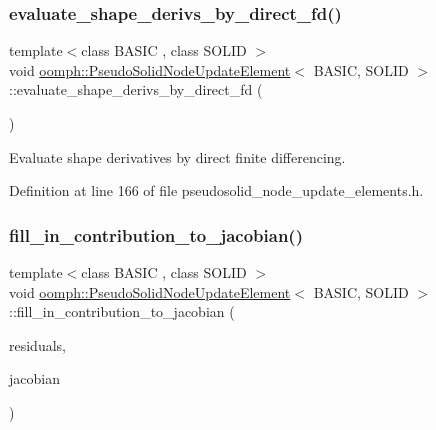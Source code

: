 \subsubsection{\texorpdfstring{evaluate\+\_\+shape\+\_\+derivs\+\_\+by\+\_\+direct\+\_\+fd()}{evaluate\_shape\_derivs\_by\_direct\_fd()}}
{\footnotesize\ttfamily template$<$class B\+A\+S\+IC , class S\+O\+L\+ID $>$ \\
void \hyperlink{classoomph_1_1PseudoSolidNodeUpdateElement}{oomph\+::\+Pseudo\+Solid\+Node\+Update\+Element}$<$ B\+A\+S\+IC, S\+O\+L\+ID $>$\+::evaluate\+\_\+shape\+\_\+derivs\+\_\+by\+\_\+direct\+\_\+fd (\begin{DoxyParamCaption}{ }\end{DoxyParamCaption})\hspace{0.3cm}{\ttfamily [inline]}}



Evaluate shape derivatives by direct finite differencing. 



Definition at line 166 of file pseudosolid\+\_\+node\+\_\+update\+\_\+elements.\+h.

\mbox{\label{classoomph_1_1PseudoSolidNodeUpdateElement_a6e3b3193e2d66317dc45f17217ddb5c3}} 
\subsubsection{\texorpdfstring{fill\+\_\+in\+\_\+contribution\+\_\+to\+\_\+jacobian()}{fill\_in\_contribution\_to\_jacobian()}}
{\footnotesize\ttfamily template$<$class B\+A\+S\+IC , class S\+O\+L\+ID $>$ \\
void \hyperlink{classoomph_1_1PseudoSolidNodeUpdateElement}{oomph\+::\+Pseudo\+Solid\+Node\+Update\+Element}$<$ B\+A\+S\+IC, S\+O\+L\+ID $>$\+::fill\+\_\+in\+\_\+contribution\+\_\+to\+\_\+jacobian (\begin{DoxyParamCaption}\item[{\hyperlink{classoomph_1_1Vector}{Vector}$<$ double $>$ \&}]{residuals,  }\item[{\hyperlink{classoomph_1_1DenseMatrix}{Dense\+Matrix}$<$ double $>$ \&}]{jacobian }\end{DoxyParamCaption})\hspace{0.3cm}{\ttfamily [inline]}}



